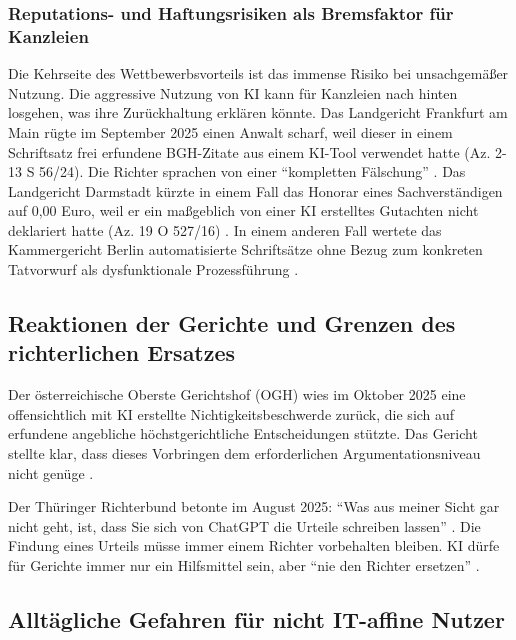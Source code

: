 \documentclass[12pt,a4paper]{article}
\begin{document}
	\subsubsection{Reputations- und Haftungsrisiken als Bremsfaktor für Kanzleien}
	Die Kehrseite des Wettbewerbsvorteils ist das immense Risiko bei unsachgemäßer Nutzung. Die aggressive Nutzung von KI kann für Kanzleien nach hinten losgehen, was ihre Zurückhaltung erklären könnte. Das Landgericht Frankfurt am Main rügte im September 2025 einen Anwalt scharf, weil dieser in einem Schriftsatz frei erfundene BGH-Zitate aus einem KI-Tool verwendet hatte (Az. 2-13 S 56/24). Die Richter sprachen von einer \enquote{kompletten Fälschung} \cite{LG Frankfurt2025}. Das Landgericht Darmstadt kürzte in einem Fall das Honorar eines Sachverständigen auf 0,00 Euro, weil er ein maßgeblich von einer KI erstelltes Gutachten nicht deklariert hatte (Az. 19 O 527/16) \cite{Kramarz2026}. In einem anderen Fall wertete das Kammergericht Berlin automatisierte Schriftsätze ohne Bezug zum konkreten Tatvorwurf als dysfunktionale Prozessführung \cite{KG Berlin2025}.
	
	\subsection{Reaktionen der Gerichte und Grenzen des richterlichen Ersatzes}
	
	Der österreichische Oberste Gerichtshof (OGH) wies im Oktober 2025 eine offensichtlich mit KI erstellte Nichtigkeitsbeschwerde zurück, die sich auf erfundene angebliche höchstgerichtliche Entscheidungen stützte. Das Gericht stellte klar, dass dieses Vorbringen dem erforderlichen Argumentationsniveau nicht genüge \cite{OGH2025}.
	
	Der Thüringer Richterbund betonte im August 2025: \enquote{Was aus meiner Sicht gar nicht geht, ist, dass Sie sich von ChatGPT die Urteile schreiben lassen} \cite{Richterbund2025}. Die Findung eines Urteils müsse immer einem Richter vorbehalten bleiben. KI dürfe für Gerichte immer nur ein Hilfsmittel sein, aber \enquote{nie den Richter ersetzen} \cite{Richterbund2025}.
	
	\subsection{Alltägliche Gefahren für nicht IT-affine Nutzer}
	
\end{document}

